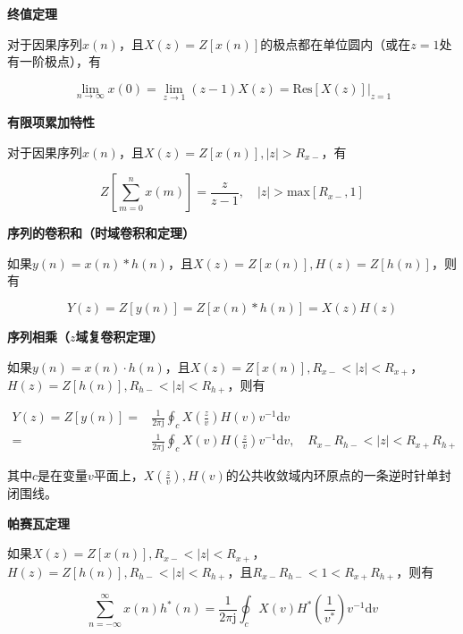 \documentclass[cn, hazy, blue, normal, 12pt]{elegantnote}
\begin{document}
\textbf{终值定理}

对于因果序列$x(n)$，且$X(z)=Z[x(n)]$的极点都在单位圆内（或在$z=1$处有一阶极点），有

\begin{equation}
        \lim_{n\rightarrow\infty}{x(0)}=\lim_{z\rightarrow 1}{(z-1)X(z)}=\text{Res}\left.[X(z)]\right|_{z=1}
\end{equation}

\textbf{有限项累加特性}

对于因果序列$x(n)$，且$X(z)=Z[x(n)], |z|>R_{x-}$，有

\begin{equation}
        Z\left[\sum_{m=0}^{n}{x(m)}\right]=\frac{z}{z-1}, \quad |z|>\text{max}[R_{x-}, 1]
\end{equation}

\textbf{序列的卷积和（时域卷积和定理）}

如果$y(n)=x(n)\ast h(n)$，且$X(z)=Z\left[x(n)\right], H(z)=Z\left[h(n)\right]$，则有

\begin{equation}
        Y(z)=Z\left[y(n)\right]=Z\left[x(n)\ast h(n)\right]=X(z)H(z)
\end{equation}

\textbf{序列相乘（$z$域复卷积定理）}

如果$y(n)=x(n)\cdot h(n)$，且$X(z)=Z\left[x(n)\right], R_{x-}<|z|<R_{x+}$，$H(z)=Z\left[h(n)\right], R_{h-}<|z|<R_{h+}$，则有

\begin{equation}
\begin{aligned}
        Y(z)=Z\left[y(n)\right]=&\frac{1}{2\pi\text{j}}\oint_c{X\left(\frac{z}{v}\right)H(v)v^{-1}\text{d}v} \\
    =&\frac{1}{2\pi\text{j}}\oint_c{X(v)H\left(\frac{z}{v}\right)v^{-1}\text{d}v}, \quad R_{x-}R_{h-}<|z|<R_{x+}R_{h+}
\end{aligned}
\end{equation}

其中$c$是在变量$v$平面上，$X\left(\frac{z}{v}\right), H(v)$的公共收敛域内环原点的一条逆时针单封闭围线。

\textbf{帕赛瓦定理}

如果$X(z)=Z\left[x(n)\right], R_{x-}<|z|<R_{x+}$，$H(z)=Z\left[h(n)\right], R_{h-}<|z|<R_{h+}$，且$R_{x-}R_{h-}<1<R_{x+}R_{h+}$，则有

\begin{equation}
        \sum_{n=-\infty}^{\infty}{x(n)h^*(n)}=\frac{1}{2\pi\text{j}}\oint_c{X(v)H^*\left(\frac{1}{v^*}\right)v^{-1}\text{d}v}
\end{equation}
\end{document}
